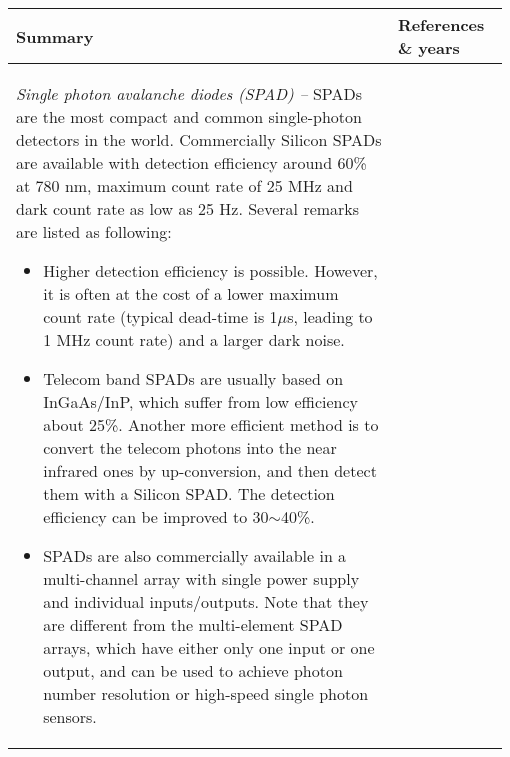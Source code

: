 \begin{table*}[!htbp]
	\begin{tabular}{|p{0.755\linewidth}|p{0.22\linewidth}|}
		\hline
	\textbf{Summary} & \textbf{References \& years} \\	\hline \hline
		\textit{Single photon avalanche diodes (SPAD) --}
		SPADs are the most compact and common single-photon detectors in the world. Commercially Silicon SPADs are available with detection efficiency around 60\% at 780 nm, maximum count rate of 25 MHz and dark count rate as low as 25 Hz. Several remarks are listed as following:
		
		\begin{itemize}
			
			\item Higher detection efficiency is possible. However, it is often at the cost of a lower maximum count rate (typical dead-time is 1$\mu$s, leading to 1 MHz count rate) and a larger dark noise.
			
			\item Telecom band SPADs are usually based on InGaAs/InP, which suffer from low efficiency about 25\%. Another more efficient method is to convert the telecom photons into the near infrared ones by up-conversion, and then detect them with a Silicon SPAD. The detection efficiency can be improved to 30$\sim$40\%.
			
			\item SPADs are also commercially available in a multi-channel array with single power supply and individual inputs/outputs. Note that they are different from the multi-element SPAD arrays, which have either only one input or one output, and can be used to achieve photon number resolution or high-speed single photon sensors.
			

\end{itemize}
\end{tabular}
\end{table*}
